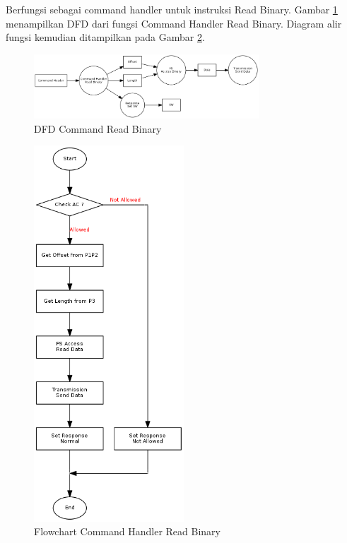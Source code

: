 Berfungsi sebagai command handler untuk instruksi Read Binary. Gambar \ref{fig-dfd-cmdread} menampilkan DFD dari fungsi Command Handler Read Binary. Diagram alir fungsi kemudian ditampilkan pada Gambar \ref{fig-flow-cmdread}. 

\begin{figure}[h]
\centering
\includegraphics[width=0.75\textwidth]{image/command/dfd_cmdread.png}
\caption{DFD Command Read Binary}
\label{fig-dfd-cmdread}
\end{figure}

\begin{figure}
\centering
\includegraphics[width=0.5\textwidth]{image/command/flow_cmdread.png}
\caption{Flowchart Command Handler Read Binary}
\label{fig-flow-cmdread}
\end{figure}

